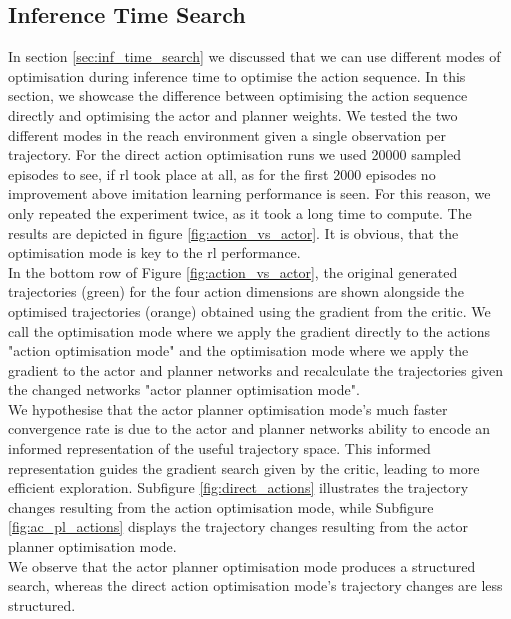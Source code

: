 \subsection{Inference Time Search}
\label{ref:com_opt_modes}
In section \ref{sec:inf_time_search} we discussed that we can use different modes of optimisation during inference time to optimise the action sequence. In this section, 
we showcase the difference between optimising the action sequence directly and optimising the actor and planner weights. We tested the two different 
modes in the reach environment given a single observation per trajectory. For the direct 
action optimisation runs we used 20000 sampled episodes to see, if \ac{rl} took place at all, as for the first 2000 episodes no improvement above 
imitation learning performance is seen. For this reason, we only repeated the experiment twice, as it took a long time to compute. The results are depicted in figure 
\ref{fig:action_vs_actor}. It is obvious, that the optimisation mode is key to the \ac{rl} performance. \\

In the bottom row of Figure \ref{fig:action_vs_actor}, the original generated trajectories (green) for the four action dimensions 
are shown alongside the optimised trajectories (orange) obtained using the gradient from the critic. We call the optimisation mode 
where we apply the gradient directly to the actions "action optimisation mode" and the optimisation mode where we apply 
the gradient to the actor and planner networks and recalculate the trajectories given the changed networks "actor planner 
optimisation mode".\\

We hypothesise that 
the actor planner optimisation mode's much faster convergence rate is due to the actor and planner networks ability to 
encode an informed representation of the useful trajectory space. This informed representation guides the gradient search 
given by the critic, leading to more efficient exploration. Subfigure \ref{fig:direct_actions} illustrates the trajectory 
changes resulting from the action optimisation mode, while Subfigure \ref{fig:ac_pl_actions} displays 
the trajectory changes resulting from the actor planner optimisation mode. \\

We observe that the actor planner 
optimisation mode produces a structured search, whereas the direct action optimisation mode's trajectory changes are less structured.\\

